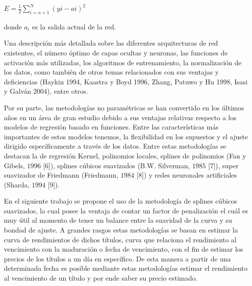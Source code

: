 \vspace*{0.2 cm}

\begin{center}
$\displaystyle{E = \frac{1}{2} \sum_{i=n+1}^{N}(y{i}-a{i})^2 }$
\end{center}

\vspace*{0.2 cm}


\noindent  donde $a_{i}$ es la salida actual de la red.

\hspace*{0.4 cm}Una descripci\'on m\'as detallada sobre las diferentes arquitecturas de red existentes, el n\'umero \'optimo de capas ocultas y neuronas, las funciones de activaci\'on m\'as utilizadas, los algoritmos de entrenamiento, la normalizaci\'on de los datos, como tambi\'en de otros temas relacionados con sus ventajas y deficiencias (Haykin 1994, Kaastra y Boyd 1996, Zhang, Patuwo y Hu 1998, Isasi y Galván 2004), entre otros.



\hspace*{0.4 cm} Por su parte, las metodolog\'ias no param\'etricas se han convertido en los \'ultimos a\~nos en un
\'area de gran estudio debido a sus ventajas relativas respecto a los modelos de regresi\'on basado en funciones. Entre las caracter\'isticas m\'as importantes de estos modelos tenemos, la flexibilidad en los supuestos y el ajuste dirigido espec\'ificamente a trav\'es de los datos. Entre estas metodolog\'ias se destacan la de regresi\'on Kernel, polinomios locales, splines de polinomios (Fan y Gibels, $1996$ [6]), splines c\'ubicos suavizados (B.W. Silverman, $1985$ [7]), super suavizador de Friedmann (Friedmann, $1984$ [8]) y redes neuronales artificiales (Sharda, $1994$ [9]).

\vspace{0.5cm}

\hspace*{0.4 cm} En el siguiente trabajo se propone el uso de la metodolog\'ia de splines c\'ubicos suavizados, la cual posee la ventaja de contar un factor de penalizaci\'on el cu\'al es muy \'util al momento de tener un balance entre la suavidad de la curva y su bondad de ajuste. A grandes rasgos estas metodolog\'ias se basan en estimar la curva de rendimientos de dichos t\'itulos, curva que relaciona el rendimiento al vencimiento con la maduraci\'on o fecha de vencimiento, con el fin de estimar los precios de los t\'itulos a un d\'ia en espec\'ifico. De esta manera a partir de una determinada fecha es posible mediante estas metodolog\'ias estimar el rendimiento al vencimiento de un t\'itulo y por ende saber su precio estimado.


